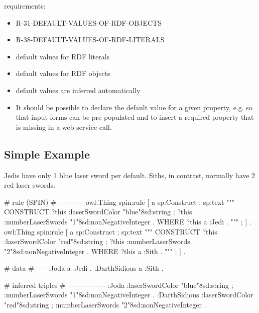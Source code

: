 \documentclass{llncs}
\begin{document}
requirements:

\begin{itemize}
	\item R-31-DEFAULT-VALUES-OF-RDF-OBJECTS
  \item R-38-DEFAULT-VALUES-OF-RDF-LITERALS
\end{itemize}



\begin{itemize}
	\item default values for RDF literals
	\item default values for RDF objects
	\item default values are inferred automatically
	\item It should be possible to declare the default value for a given property, e.g. so that input forms can be pre-populated and to insert a required property that is missing in a web service call. 
\end{itemize}

\subsection{Simple Example}

Jedis have only 1 blue laser sword per default.
Siths, in contrast, normally have 2 red laser swords.

\begin{ex}
# rule (SPIN)
# -----------
owl:Thing
    spin:rule [
        a sp:Construct ;
            sp:text """
                CONSTRUCT {            
                    ?this :laserSwordColor "blue"^^xsd:string ;
                    ?this :numberLaserSwords "1"^^xsd:nonNegativeInteger . 
                }
                WHERE {             
                    ?this a :Jedi .            
                } """ ; ] .
owl:Thing
    spin:rule [
        a sp:Construct ;
            sp:text """
                CONSTRUCT {
                    ?this :laserSwordColor "red"^^xsd:string ;
                    ?this :numberLaserSwords "2"^^xsd:nonNegativeInteger . 
                }
                WHERE {             
                    ?this a :Sith .            
                } """ ; ] .
\end{ex}

\begin{ex}
# data
# ----
:Joda a :Jedi .
:DarthSidious a :Sith .
\end{ex}

\begin{ex}
# inferred triples
# ----------------
:Joda 
    :laserSwordColor "blue"^^xsd:string ;
    :numberLaserSwords "1"^^xsd:nonNegativeInteger .
:DarthSidious 
    :laserSwordColor "red"^^xsd:string ;
    :numberLaserSwords "2"^^xsd:nonNegativeInteger .
\end{ex}
\end{document}
